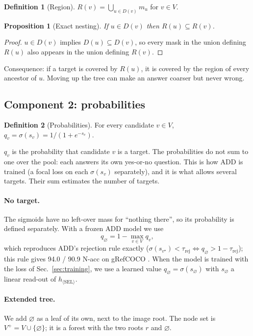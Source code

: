 \documentclass[11pt,a4paper]{article}
\newtheorem{proposition}{Proposition}
\theoremstyle{definition}
\newtheorem{definition}{Definition}
\theoremstyle{remark}
\newcommand{\nul}{\varnothing}
\begin{document}
\begin{definition}[Region]\label{def:region}
$R(v)=\bigcup_{u\in D(v)}m_u$ for $v\in V$.
\end{definition}

\begin{proposition}[Exact nesting]\label{prop:nest}
If $u\in D(v)$ then $R(u)\subseteq R(v)$.
\end{proposition}
\begin{proof}
$u\in D(v)$ implies $D(u)\subseteq D(v)$, so every mask in the union defining $R(u)$ also appears in the union
defining $R(v)$.
\end{proof}
\noindent Consequence: if a target is covered by $R(u)$, it is covered by the region of every ancestor of $u$.
Moving up the tree can make an answer coarser but never wrong.

\subsection{Component 2: probabilities}
\label{sec:prob}
\begin{definition}[Probabilities]
For every candidate $v\in V$, $q_v=\sigma(s_v)=1/(1+e^{-s_v})$.
\end{definition}
$q_v$ is the probability that candidate $v$ is a target. The probabilities do not sum to one over the pool: each
answers its own yes-or-no question. This is how ADD is trained (a focal loss \cite{focal} on each $\sigma(s_v)$
separately), and it is what allows several targets. Their sum estimates the number of targets.

\paragraph{No target.} The sigmoids have no left-over mass for ``nothing there'', so its probability is defined
separately. With a frozen ADD model we use
\[
q_\nul=1-\max_{v\in V}q_v ,
\]
which reproduces ADD's rejection rule exactly ($\sigma(s_{v^\star})<\tau_{\mathrm{rej}}\iff q_\nul>1-\tau_{\mathrm{rej}}$);
this rule gives 94.0 / 90.9 N-acc on gRefCOCO \cite{add}. When the model is trained with the loss of
Sec.~\ref{sec:training}, we use a learned value $q_\nul=\sigma(s_\nul)$ with $s_\nul$ a linear read-out of
$h_{\langle\mathrm{SEL}\rangle}$.

\paragraph{Extended tree.} We add $\nul$ as a leaf of its own, next to the image root. The node set is
$V^+=V\cup\{\nul\}$; it is a forest with the two roots $r$ and $\nul$.
\end{document}
